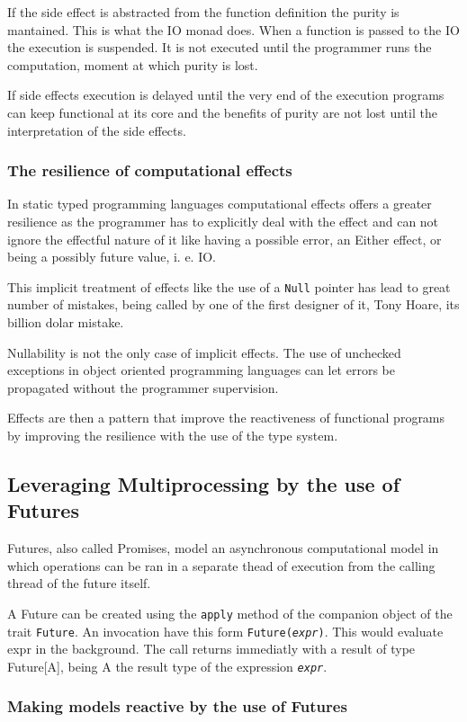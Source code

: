 \documentclass[../main.tex]{subfiles}
\begin{document}
If the side effect is abstracted from the function definition the purity is
mantained. This is what the IO monad does. When a function is passed to the IO
the execution is suspended. It is not executed until the programmer runs the
computation, moment at which purity is lost.

If side effects execution is delayed until the very end of the execution programs
can keep functional at its core and the benefits of purity are not lost until
the interpretation of the side effects.

\subsubsection{The resilience of computational effects}
In static typed programming languages computational effects offers a greater resilience as the
programmer has to explicitly deal with the effect and can not ignore the
effectful nature of it like having a possible error, an Either effect, or being a possibly
future value, i. e. IO.

This implicit treatment of effects like the use of a \texttt{Null} pointer has
lead to great number of mistakes, being called by one of the first designer of
it, Tony Hoare, its billion dolar mistake.

Nullability is not the only case of implicit effects. The use of unchecked
exceptions in object oriented programming languages can let errors be propagated
without the programmer supervision.

Effects are then a pattern that improve the reactiveness of functional programs by
improving the resilience with the use of the type system.

\subsection{Leveraging Multiprocessing by the use of Futures}
Futures, also called Promises, model an asynchronous computational model in
which operations can be ran in a separate thead of execution from the calling
thread of the future itself.

A Future can be created using the \texttt{apply} method of the companion object
of the trait \texttt{Future}. An invocation have this form
\texttt{Future(\textit{expr})}. This would evaluate expr in the background. The
call returns immediatly with a result of type Future[A], being A the result type
of the expression \texttt{\textit{expr}}.

\subsubsection{Making models reactive by the use of Futures}
\end{document}

